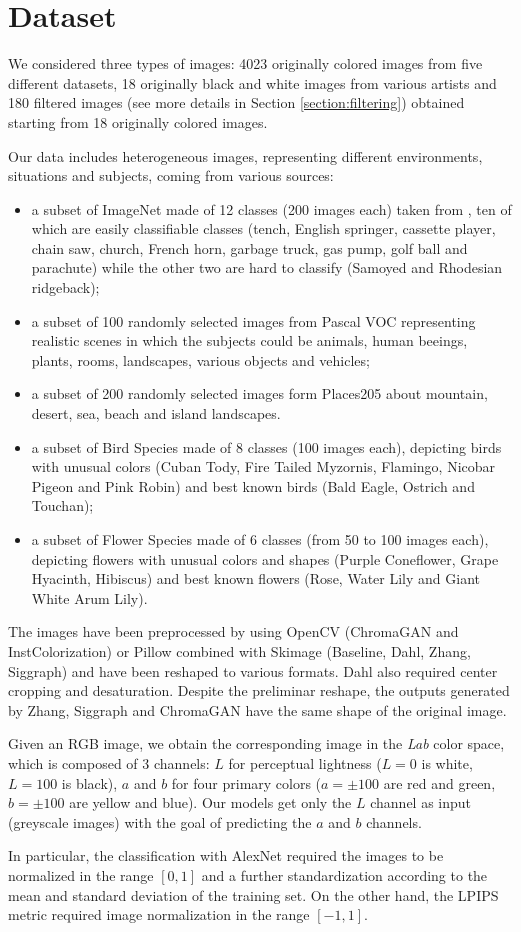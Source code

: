 \section{Dataset}
We considered three types of images: 4023 originally colored images from five different datasets, 18 originally
black and white images from various artists and 180 filtered images (see more details in Section \ref{section:filtering})
obtained starting from 18 originally colored images.

Our data includes heterogeneous images, representing different environments, situations and subjects, coming from various sources:
\begin{itemize}
	\item a subset of ImageNet made of 12 classes (200 images each) taken from \cite{imagenette}, ten of which are easily classifiable classes (tench, English springer, cassette player, chain saw, church, French horn, garbage truck, gas pump, golf ball and parachute) while the other two are hard to classify (Samoyed and Rhodesian ridgeback);
	\item a subset of 100 randomly selected images from Pascal VOC \cite{pascal} representing realistic scenes in which the subjects could be animals, human beeings, plants, rooms, landscapes, various objects and vehicles;
	\item a subset of 200 randomly selected images form Places205 \cite{place} about mountain, desert, sea, beach and island landscapes.
	\item a subset of Bird Species \cite{bird} made of 8 classes (100 images each), depicting birds with unusual colors (Cuban Tody, Fire Tailed Myzornis, Flamingo, Nicobar Pigeon and Pink Robin) and best known birds (Bald Eagle, Ostrich and Touchan);
	\item a subset of Flower Species \cite{flower} made of 6 classes (from 50 to 100 images each), depicting flowers with unusual colors and shapes (Purple Coneflower, Grape Hyacinth, Hibiscus) and best known flowers (Rose, Water Lily and Giant White Arum Lily).
\end{itemize}

The images have been preprocessed by using OpenCV (ChromaGAN and InstColorization) or Pillow combined with Skimage
(Baseline, Dahl, Zhang, Siggraph) and have been reshaped to various formats. Dahl also required center cropping
and desaturation. Despite the preliminar reshape, the outputs generated by Zhang, Siggraph and ChromaGAN
have the same shape of the original image.

Given an RGB image, we obtain the corresponding image in the \textit{Lab} color space, which is composed of 3
channels: $L$ for perceptual lightness ($L=0$ is white, $L=100$ is black), $a$ and $b$ for
four primary colors ($a=\pm100$ are red and green, $b=\pm100$ are yellow and blue). Our models get only
the $L$ channel as input (greyscale images) with the goal of predicting the $a$ and $b$
channels.

In particular, the classification with AlexNet required the images to be normalized in the
range $[0,1]$ and a further standardization according to the mean and standard deviation of the
training set. On the other hand, the LPIPS metric required image normalization in the range $[-1,1]$.